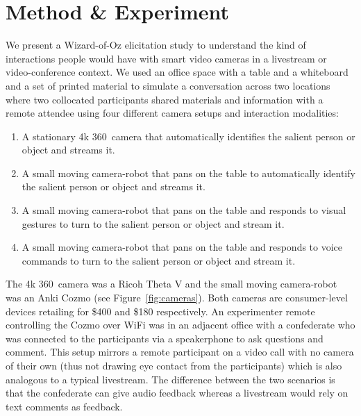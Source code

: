 \documentclass{tufte-handout}
\begin{document}
\section{Method \& Experiment}
We present a Wizard-of-Oz elicitation study to understand the kind of
interactions people would have with smart video cameras in a
livestream or video-conference context.  We used an office space with
a table and a whiteboard and a set of printed material to simulate a
conversation across two locations where two collocated participants
shared materials and information with a remote attendee using four
different camera setups and interaction modalities:
\begin{enumerate}
\item\label{item:1} A stationary 4k 360\textdegree\ camera that
  automatically identifies the salient person or object and streams
  it.
\item\label{item:2} A small moving camera-robot that pans on the
  table to automatically identify the salient person or object and
  streams it.
\item\label{item:3} A small moving camera-robot that pans on the
  table and responds to visual gestures to turn to the salient person
  or object and stream it.
\item\label{item:4} A small moving camera-robot that pans on the
  table and responds to voice commands to turn to the salient person
  or object and stream it.
\end{enumerate}
The 4k 360\textdegree\ camera was a Ricoh Theta V and the small moving
camera-robot was an Anki Cozmo (see Figure~\ref{fig:cameras}).  Both
cameras are consumer-level devices retailing for \$400 and \$180
respectively.  An experimenter remote controlling the Cozmo over WiFi
was in an adjacent office with a confederate who was connected to the
participants via a speakerphone to ask questions and comment.  This
setup mirrors a remote participant on a video call with no camera of
their own (thus not drawing eye contact from the participants) which
is also analogous to a typical livestream.  The difference between the
two scenarios is that the confederate can give audio feedback whereas
a livestream would rely on text comments as feedback.
\end{document}

